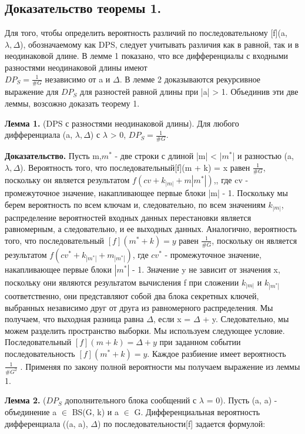 \documentclass[utf8,14pt,a4paper,oneside,russian]{book}
\begin{document}
\subsection{Доказательство теоремы 1.} 

Для того, чтобы определить вероятность различий по последовательному
[f](a,$\lambda, \Delta$), обозначаемому как DPS, следует учитывать 
различия как в равной, так и в неодинаковой длине. В лемме 1 показано, 
что все дифференциалы с входными разностями неодинаковой длины имеют \\
$DP_S = \frac {1}{\#G}$ независимо от a и $\Delta$. В лемме 2 доказываются 
рекурсивное выражение для $DP_S$ для разностей равной длины при |a| > 1. 
Объединив эти две леммы, возсожно доказать теорему 1.

\textbf{Лемма 1.} (DPS с разностями неодинаковой длины). Для любого \\
дифференциала (a, $\lambda, \Delta$) с $\lambda$ > 0, $DP_S = \frac {1}{\#G}$.

\textbf{Доказательство.} Пусть m,$m^*$ - две строки с длиной |m| < |$m^*$| и 
разностью (a, $\lambda, \Delta$). Вероятность того, что 
последовательный[f](m + k) = x равен $\frac {1}{\#G}$, поскольку он является 
результатом $f(cv + k_{|m|} + m{|m^*|})$,, где cv - промежуточное значение, 
накапливающее первые блоки |m| - 1. Поскольку мы берем вероятность по всем 
ключам и, следовательно, по всем значениям $k_{|m|}$, распределение вероятностей
входных данных перестановки является равномерным, а следовательно, и ее 
выходных данных. Аналогично, вероятность того, что 
последовательный $[f](m^* +k) = y$ равен $\frac {1}{\#G}$, 
поскольку он является результатом $f(cv^* +k_{|m^*|} +m_{|m^*|})$, 
где $cv^*$ - промежуточное значение, накапливающее первые блоки $|m^*|$ - 1. 
Значение y не зависит от значения x, поскольку они являются результатом 
вычисления f при сложении $k_{|m|}$ и $k_{|m^*|}$
соответственно, они представляют собой два блока секретных ключей, выбранных 
независимо друг от друга из равномерного распределения. Мы получаем, что 
выходная разница равна $\Delta$, если x = $\Delta$ + y. Следовательно, мы
можем разделить пространство выборки. Мы используем следующее условие. 
Последовательный $[f](m + k) = \Delta + y$ при заданном событии 
последовательность $[f](m^* + k) = y$. Каждое разбиение имеет 
вероятность $\frac {1}{\#G^2}$ . Применяя по закону полной вероятности 
мы получаем выражение из леммы 1.

\textbf{Лемма 2.} ($DP_S$ дополнительного блока сообщений с $\lambda$ = 0).
Пусть (a, a) - объединение a $\in$ BS(G, k) и a $\in$ G. Дифференциальная 
вероятность дифференциала ((a, a), $\Delta$) по последовательности[f] 
задается формулой:
\end{document}
